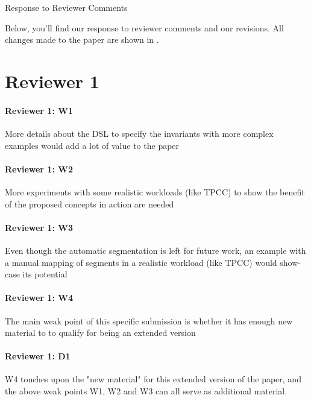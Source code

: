 \documentclass[9pt]{article}
\begin{document}
\begin{center}
  \ttlfnt Response to Reviewer Comments
\end{center}

\begin{multicols*}{2}
Below, you'll find our response to reviewer comments and our revisions. All
changes made to the paper are shown in .

\section*{Reviewer 1}
\paragraph{Reviewer 1: W1}
\begin{feedback}
  More details about the DSL to specify the invariants with more complex
  examples would add a lot of value to the paper
\end{feedback}
\paragraph{Reviewer 1: W2}
\begin{feedback}
  More experiments with some realistic workloads (like TPCC) to show the
  benefit of the proposed concepts in action are needed
\end{feedback}
\paragraph{Reviewer 1: W3}
\begin{feedback}
  Even though the automatic segmentation is left for future work, an example
  with a manual mapping of segments in a realistic workload (like TPCC) would
  show-case its potential
\end{feedback}
\paragraph{Reviewer 1: W4}
\begin{feedback}
  The main weak point of this specific submission is whether it has enough new
  material to to qualify for being an extended version
\end{feedback}
\paragraph{Reviewer 1: D1}
\begin{feedback}
  W4 touches upon the "new material" for this extended version of the paper,
  and the above weak points W1, W2 and W3 can all serve as additional material.
\end{feedback}

\end{multicols*}
\end{document}

